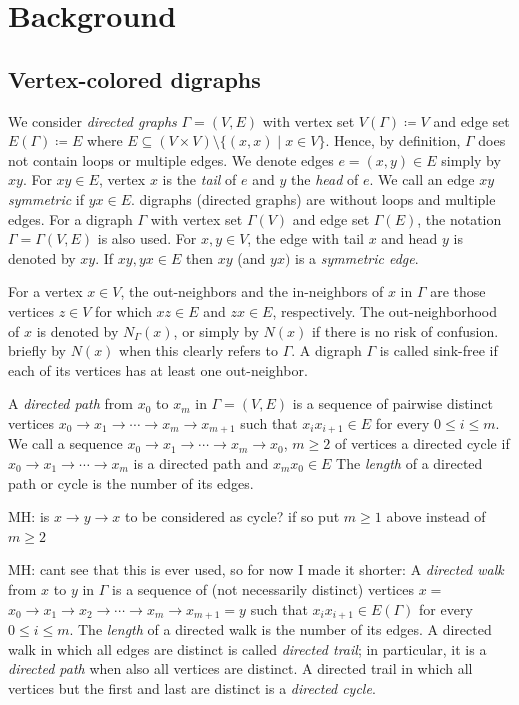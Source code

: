 \documentclass[final,3p,times]{elsarticle}
\newcommand{\TODO}[1]{\begingroup\color{red}#1\endgroup}
\newcommand{\OLD}[1]{\begingroup\tiny\color{gray}#1\endgroup}
\newcommand{\mh}[1]{\begingroup\color{magenta}#1\endgroup}
\begin{document}
\section{Background}
\label{sec:background}
\subsection{Vertex-colored digraphs}

\mh{
We consider \emph{directed graphs} $\Gamma=(V,E)$ with vertex set $V(\Gamma)\coloneqq V$ and edge set $E(\Gamma)\coloneqq E$
where $E\subseteq (V\times V)\setminus \{(x,x)\mid x\in V\}$. Hence, by definition, $\Gamma$ does not contain 
loops or multiple edges. We denote edges $e=(x,y)\in E$ simply by $xy$. For $xy\in E$, vertex $x$ is the \emph{tail} of $e$
and $y$ the \emph{head} of $e$. We call an edge $xy$ \emph{symmetric} if $yx\in E$. }
\OLD{
digraphs (directed graphs) are without loops and multiple edges. For a digraph $\Gamma$ with vertex set $\Gamma(V)$ and edge set $\Gamma(E)$, the notation $\Gamma=\Gamma(V,E)$ is also used. For $x,y\in V$,
the edge with tail $x$ and head $y$ is denoted by $xy$. If $xy,yx\in E$ then $xy$ (and $yx)$ is a {\emph{symmetric edge}}.
}

For a vertex $x\in V$, the out-neighbors and the in-neighbors of $x$ in $\Gamma$
are those vertices $z\in V$ for which $xz\in E$ and $zx\in E$, respectively. The
out-neighborhood of $x$ is denoted by $N_\Gamma(x)$, or 
\mh{simply by  $N(x)$ if there is no risk of confusion.}
\OLD{briefly by $N(x)$ when
this clearly refers to $\Gamma$.} A digraph $\Gamma$ is called sink-free if each
of its vertices has at least one out-neighbor.

\mh{
A \emph{directed path} from $x_0$ to $x_m$ in $\Gamma = (V,E)$ is a sequence of 
pairwise distinct vertices $x_0\rightarrow x_1 \rightarrow \cdots\rightarrow x_m
\rightarrow x_{m+1}$ such that $x_ix_{i+1}\in E$ for every
$0\le i \le m$. 
We call a sequence $x_0\rightarrow x_1 \rightarrow \cdots\rightarrow x_m\rightarrow  x_0$, $m\geq 2$
of vertices a directed cycle if  $x_0\rightarrow x_1 \rightarrow \cdots\rightarrow x_m$
is a directed path and $x_mx_0\in E$
The \emph{length} of a directed path or cycle is the number of its edges.
}

\TODO{MH: is $x\rightarrow y \rightarrow x$ to be considered as cycle? if so put 
$m\geq 1$ above instead of $m\geq 2$}

\OLD{\TODO{MH: cant see that this is ever used, so for now I made it shorter:}
A \emph{directed walk} from $x$ to $y$ in $\Gamma$ is a sequence of \mh{(not necessarily
distinct)} vertices
\OLD{$x=$} $x_0\rightarrow x_1 \rightarrow x_2 \rightarrow \cdots\rightarrow x_m
\rightarrow x_{m+1}$\OLD{$=y $} such that $x_ix_{i+1}\in E(\Gamma)$ for every
$0\le i \le m$. The \emph{length} of a directed walk is the number of its edges.
A directed walk in which all edges are distinct is called \emph{directed trail};
in particular, it is a \emph{directed path} when also all vertices are distinct.
A directed trail in which all vertices but the first and last are distinct is a
\emph{directed cycle}. 
}
\end{document}
